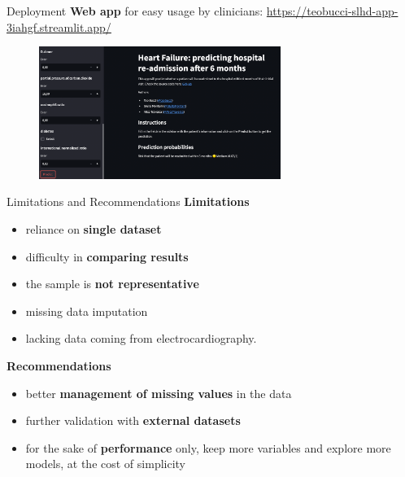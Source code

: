 \documentclass[aspectratio=169,xcolor=dvipsnames]{beamer}
\begin{document}
\begin{frame}{Deployment}
    \textbf{Web app} for easy usage by clinicians:
    {\scriptsize\url{https://teobucci-slhd-app-3iahgf.streamlit.app/}}
    \begin{figure}[htpb]
        \centering
        \includegraphics[width=0.7\textwidth]{webapp}
    \end{figure}
\end{frame}



\begin{frame}{Limitations and Recommendations}
\textbf{Limitations}
\begin{itemize}
  \item reliance on \textbf{single dataset}
  \item difficulty in \textbf{comparing results}
  \item the sample is \textbf{not representative}
  \item missing data imputation
  \item lacking data coming from electrocardiography.
\end{itemize}
\pause
\textbf{Recommendations}
\begin{itemize}
  \item better \textbf{management of missing values} in the data
  \item further validation with \textbf{external datasets}
  \item for the sake of \textbf{performance} only, keep more variables and explore more models, at the cost of simplicity
\end{itemize}
\end{frame}
\end{document}
